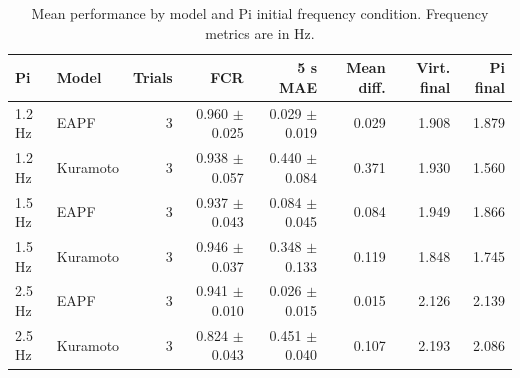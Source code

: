 \begin{table}[htbp]
\centering
\footnotesize
\caption{Mean performance by model and Pi initial frequency condition. Frequency metrics are in Hz.}
\label{tab:condition_summary}
\begin{tabular}{@{}llrrrrrr@{}}
\toprule
\textbf{Pi} & \textbf{Model} & \textbf{Trials} & \textbf{FCR} & \textbf{5 s MAE} & \textbf{Mean diff.} & \textbf{Virt. final} & \textbf{Pi final} \\
\midrule
1.2 Hz & EAPF & 3 & 0.960 $\pm$ 0.025 & 0.029 $\pm$ 0.019 & 0.029 & 1.908 & 1.879 \\
1.2 Hz & Kuramoto & 3 & 0.938 $\pm$ 0.057 & 0.440 $\pm$ 0.084 & 0.371 & 1.930 & 1.560 \\
1.5 Hz & EAPF & 3 & 0.937 $\pm$ 0.043 & 0.084 $\pm$ 0.045 & 0.084 & 1.949 & 1.866 \\
1.5 Hz & Kuramoto & 3 & 0.946 $\pm$ 0.037 & 0.348 $\pm$ 0.133 & 0.119 & 1.848 & 1.745 \\
2.5 Hz & EAPF & 3 & 0.941 $\pm$ 0.010 & 0.026 $\pm$ 0.015 & 0.015 & 2.126 & 2.139 \\
2.5 Hz & Kuramoto & 3 & 0.824 $\pm$ 0.043 & 0.451 $\pm$ 0.040 & 0.107 & 2.193 & 2.086 \\
\bottomrule
\end{tabular}
\end{table}
